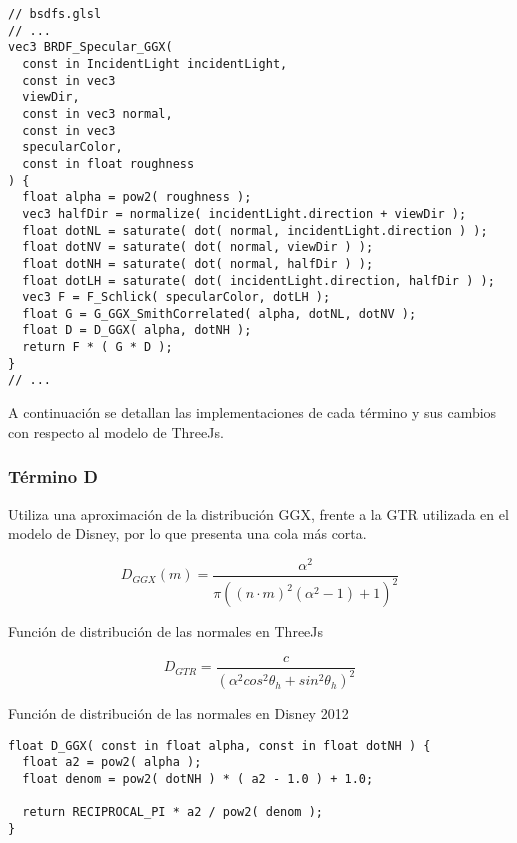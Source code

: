   \singlespacing
  \begin{lstlisting}[caption=Clase MeshClothMaterial]
// bsdfs.glsl
// ...
vec3 BRDF_Specular_GGX(
  const in IncidentLight incidentLight,
  const in vec3
  viewDir,
  const in vec3 normal,
  const in vec3
  specularColor,
  const in float roughness
) {
  float alpha = pow2( roughness );
  vec3 halfDir = normalize( incidentLight.direction + viewDir );
  float dotNL = saturate( dot( normal, incidentLight.direction ) );
  float dotNV = saturate( dot( normal, viewDir ) );
  float dotNH = saturate( dot( normal, halfDir ) );
  float dotLH = saturate( dot( incidentLight.direction, halfDir ) );
  vec3 F = F_Schlick( specularColor, dotLH );
  float G = G_GGX_SmithCorrelated( alpha, dotNL, dotNV );
  float D = D_GGX( alpha, dotNH );
  return F * ( G * D );
}
// ...
  \end{lstlisting}
  \singlespacing

A continuaci\'on se detallan las implementaciones de cada t\'ermino y sus cambios con respecto al modelo de ThreeJs.

  \subsubsection{T\'ermino D}
  Utiliza una aproximaci\'on de la distribuci\'on GGX, frente a la GTR utilizada en el modelo de Disney, por lo que
  presenta una cola m\'as corta.\\

  \begin{eqfloat}
    \begin{equation}
      D_{GGX}(m) = \frac{\alpha^2}{\pi((n\cdotp{m})^2(\alpha^2 - 1 ) + 1)^2}
    \end{equation}
  \caption{Funci\'on de distribuci\'on de las normales en ThreeJs}
  \end{eqfloat}
  \singlespacing

  \begin{eqfloat}
    \begin{equation}
      D_{GTR} = \frac
      {c}
      {(\alpha^2 cos^2 \theta_h + sin^2 \theta_h)^2}
    \end{equation}
  \caption{Funci\'on de distribuci\'on de las normales en Disney 2012}
  \end{eqfloat}
  \singlespacing

  \begin{lstlisting}[caption=Implementaci\'on en ThreeJs del t\'ermino de geometr\'ia]
float D_GGX( const in float alpha, const in float dotNH ) {
  float a2 = pow2( alpha );
  float denom = pow2( dotNH ) * ( a2 - 1.0 ) + 1.0;

  return RECIPROCAL_PI * a2 / pow2( denom );
}
  \end{lstlisting}
  \singlespacing

